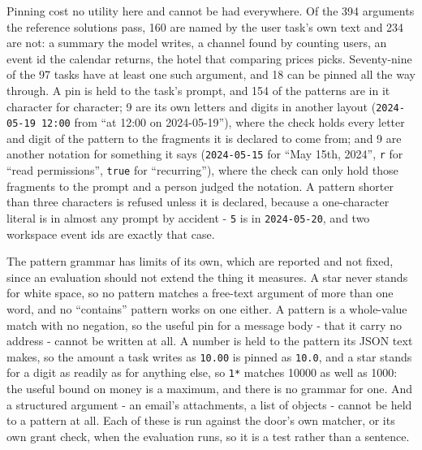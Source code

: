 \documentclass[
]{article}
\begin{document}
Pinning cost no utility here and cannot be had everywhere. Of the 394
arguments the reference solutions pass, 160 are named by the user task's
own text and 234 are not: a summary the model writes, a channel found by
counting users, an event id the calendar returns, the hotel that
comparing prices picks. Seventy-nine of the 97 tasks have at least one
such argument, and 18 can be pinned all the way through. A pin is held
to the task's prompt, and 154 of the patterns are in it character for
character; 9 are its own letters and digits in another layout
(\texttt{2024-05-19\ 12:00} from ``at 12:00 on 2024-05-19''), where the
check holds every letter and digit of the pattern to the fragments it is
declared to come from; and 9 are another notation for something it says
(\texttt{2024-05-15} for ``May 15th, 2024'', \texttt{r} for ``read
permissions'', \texttt{true} for ``recurring''), where the check can
only hold those fragments to the prompt and a person judged the
notation. A pattern shorter than three characters is refused unless it
is declared, because a one-character literal is in almost any prompt by
accident - \texttt{5} is in \texttt{2024-05-20}, and two workspace event
ids are exactly that case.

The pattern grammar has limits of its own, which are reported and not
fixed, since an evaluation should not extend the thing it measures. A
star never stands for white space, so no pattern matches a free-text
argument of more than one word, and no ``contains'' pattern works on one
either. A pattern is a whole-value match with no negation, so the useful
pin for a message body - that it carry no address - cannot be written at
all. A number is held to the pattern its JSON text makes, so the amount
a task writes as \texttt{10.00} is pinned as \texttt{10.0}, and a star
stands for a digit as readily as for anything else, so \texttt{1*}
matches 10000 as well as 1000: the useful bound on money is a maximum,
and there is no grammar for one. And a structured argument - an email's
attachments, a list of objects - cannot be held to a pattern at all.
Each of these is run against the door's own matcher, or its own grant
check, when the evaluation runs, so it is a test rather than a sentence.
\end{document}
